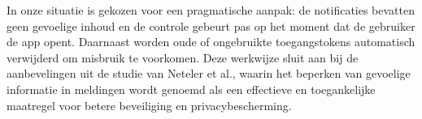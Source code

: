 In onze situatie is gekozen voor een pragmatische aanpak: de notificaties bevatten geen gevoelige inhoud en de controle gebeurt pas op het moment dat de gebruiker de app opent. Daarnaast worden oude of ongebruikte toegangstokens automatisch verwijderd om misbruik te voorkomen. Deze werkwijze sluit aan bij de aanbevelingen uit de studie van Neteler et al., waarin het beperken van gevoelige informatie in meldingen wordt genoemd als een effectieve en toegankelijke maatregel voor betere beveiliging en privacybescherming\autocite{Neteler2024}.\\



